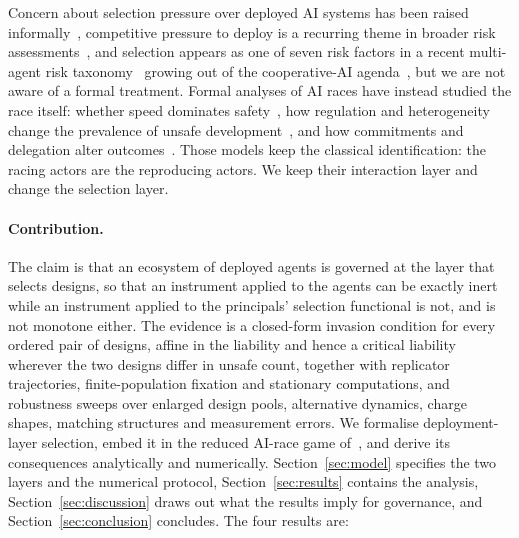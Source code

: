 \documentclass[pdflatex]{sn-jnl}
\theoremstyle{thmstyleone}
\theoremstyle{thmstylethree}
\theoremstyle{thmstyletwo}
\begin{document}
Concern about selection pressure over deployed AI systems has been raised
informally~\citep{hendrycks2023natural}, competitive pressure to deploy is a
recurring theme in broader risk assessments~\citep{bengio2024managing}, and
selection appears as one of seven risk factors in a recent multi-agent risk
taxonomy~\citep{hammond2025multiagent} growing out of the cooperative-AI
agenda~\citep{dafoe2020open,dafoe2021cooperative}, but we are not aware of a
formal treatment.
Formal analyses of AI races have instead studied the race itself: whether
speed dominates safety~\citep{armstrong2016precipice}, how regulation and
heterogeneity change the prevalence of unsafe development~\citep{han2020regulate,cimpeanu2022heterogeneous}, and how commitments and
delegation alter outcomes~\citep{askell2019cooperation,domingos2022delegation,terrucha2024committing}.
Those models keep the classical identification: the racing actors are the
reproducing actors. We keep their interaction layer and change the selection
layer.

\paragraph{Contribution.}
The claim is that an ecosystem of deployed agents is governed at the layer
that selects designs, so that an instrument applied to the agents can be
exactly inert while an instrument applied to the principals' selection
functional is not, and is not monotone either. The evidence is a closed-form
invasion condition for every ordered pair of designs, affine in the liability
and hence a critical liability wherever the two designs differ in unsafe
count, together with replicator trajectories, finite-population fixation and
stationary computations, and robustness sweeps over enlarged design pools,
alternative dynamics, charge shapes, matching structures and measurement
errors.
We formalise deployment-layer selection, embed it in the reduced AI-race game
of~\citet{domingos2026falling}, and derive its consequences analytically and
numerically. Section~\ref{sec:model} specifies the two layers and the numerical protocol,
Section~\ref{sec:results} contains the analysis,
Section~\ref{sec:discussion} draws out what the results imply for
governance, and Section~\ref{sec:conclusion} concludes.
The four results are:
\end{document}

